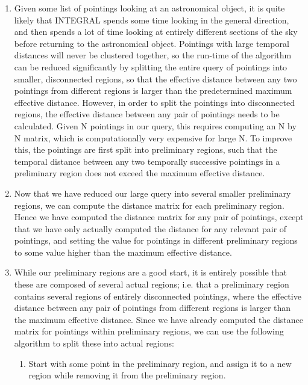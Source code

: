 \documentclass{report}
\begin{document}
\begin{enumerate}
    \item Given some list of pointings looking at an astronomical object, it is quite likely that INTEGRAL spends some
    time looking in the general direction, and then spends a lot of time looking at entirely different sections of the
    sky before returning to the astronomical object. Pointings with large temporal distances will never be clustered
    together, so the run-time of the algorithm can be reduced significantly by splitting the entire query of pointings
    into smaller, disconnected regions, so that the effective distance between any two pointings from different regions
    is larger than the predetermined maximum effective distance. However, in order to split the pointings into
    disconnected regions, the effective distance between any pair of pointings needs to be calculated. Given N
    pointings in our query, this requires computing an N by N matrix, which is computationally very expensive for large
    N. To improve this, the pointings are first split into preliminary regions, such that the temporal distance between
    any two temporally successive pointings in a preliminary region does not exceed the maximum effective distance.
    \item Now that we have reduced our large query into several smaller preliminary regions, we can compute the
    distance matrix for each preliminary region. Hence we have computed the distance matrix for any pair of pointings,
    except that we have only actually computed the distance for any relevant pair of pointings, and setting the value
    for pointings in different preliminary regions to some value higher than the maximum effective distance.
    \item While our preliminary regions are a good start, it is entirely possible that these are composed of several
    actual regions; i.e. that a preliminary region contains several regions of entirely disconnected pointings, where
    the effective distance between any pair of pointings from different regions is larger than the maximum effective
    distance. Since we have already computed the distance matrix for pointings within preliminary regions, we can use
    the following algorithm to split these into actual regions:
    \begin{enumerate}
        \item \label{itm: region1} Start with some point in the preliminary region, and assign it to a new region while
        removing it from the preliminary region.

\end{enumerate}
\end{enumerate}
\end{document}
